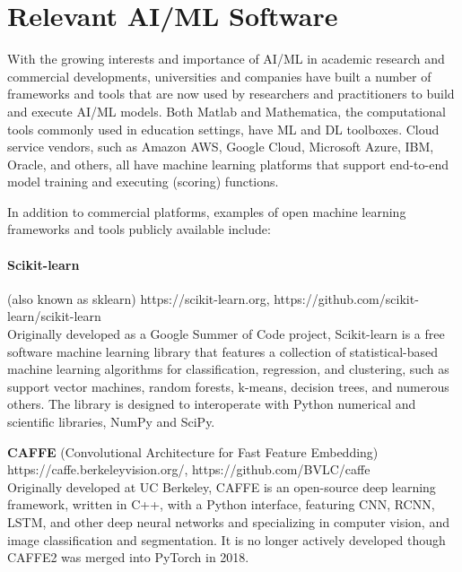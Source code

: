 \section{Relevant AI/ML Software}
\label{sec:ai_tools}

With the growing interests and importance of AI/ML in academic research and commercial developments, universities and companies have built a number of frameworks and tools that are now used by researchers and practitioners to build and execute AI/ML models. Both Matlab and Mathematica, the computational tools commonly used in education settings, have ML and DL toolboxes. Cloud service vendors, such as Amazon AWS, Google Cloud, Microsoft Azure, IBM, Oracle, and others, all have machine learning platforms that support end-to-end model training and executing (scoring) functions. 

In addition to commercial platforms, examples of open machine learning frameworks and tools publicly available include:

\paragraph{Scikit-learn} (also known as sklearn) https://scikit-learn.org, https://github.com/scikit-learn/scikit-learn\\Originally developed as a Google Summer of Code project, Scikit-learn is a free software machine learning library that features a collection of statistical-based machine learning algorithms for classification, regression, and clustering, such as support vector machines, random forests, k-means, decision trees, and numerous others. The library is designed to interoperate with Python numerical and scientific libraries, NumPy and SciPy. 

\noindent\textbf{CAFFE} (Convolutional Architecture for Fast Feature Embedding) \\https://caffe.berkeleyvision.org/, https://github.com/BVLC/caffe \\Originally developed at UC Berkeley, CAFFE is an open-source deep learning framework, written in C++, with a Python interface, featuring CNN, RCNN, LSTM, and other deep neural networks and specializing in computer vision, and image classification and segmentation. It is no longer actively developed though CAFFE2 was merged into PyTorch in 2018.

